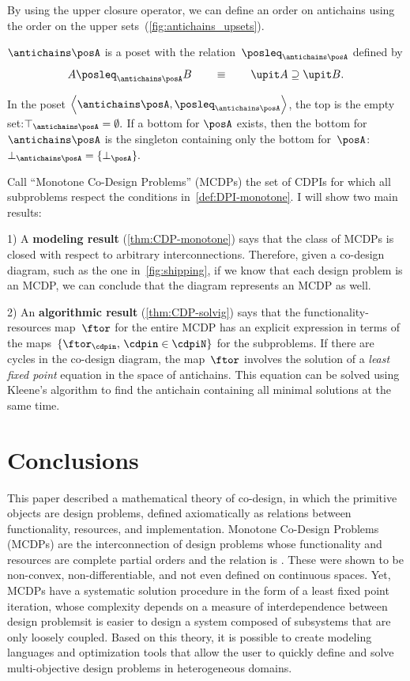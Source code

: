 By using the upper closure operator, we can define an order on antichains
using the order on the upper sets~(\cref{fig:antichains_upsets}).
\begin{lemma}
    \label{lem:antichains-are-poset}$\antichains\posA$ is a poset with
    the relation~$\posleq_{\antichains\posA}$ defined by
    \[
        A\posleq_{\antichains\posA}B\qquad\equiv\qquad\upit A\supseteq\upit B.
    \]
\end{lemma}
In the poset $\left\langle \antichains\posA,\posleq_{\antichains\posA}\right\rangle $,
the top is the empty set:$\top_{\antichains\posA}=\emptyset.$ If
a bottom for $\posA$ exists, then the bottom for~$\antichains\posA$
is the singleton containing only the bottom for~$\posA$: $\bot_{\antichains\posA}=\{\bot_{\posA}\}.$






Call ``Monotone Co-Design Problems'' (MCDPs) the set of CDPIs for
which all subproblems respect the conditions in~\cref{def:DPI-monotone}.
I will show two main results:

1) A \textbf{modeling result} (\cref{thm:CDP-monotone})
says that the class of MCDPs is closed with respect to arbitrary interconnections.
Therefore, given a co-design diagram, such as the one in~\cref{fig:shipping},
if we know that each design problem is an MCDP, we can conclude that
the diagram represents an MCDP as well.

2) An \textbf{algorithmic result }(\cref{thm:CDP-solvig})
says that the functionality-resources map~$\ftor$ for the entire
MCDP has an explicit expression in terms of the maps~$\{\ftor_{\cdpin},\,\cdpin\in\cdpiN\}$
for the subproblems. If there are cycles in the co-design diagram,
the map~$\ftor$ involves the solution of a\emph{ least fixed point}
equation in the space of antichains. This equation can be solved using
Kleene's algorithm to find the antichain containing all minimal solutions
at the same time.


\section{Conclusions}

This paper described a mathematical theory of co-design, in which
the primitive objects are design problems, defined axiomatically as
relations between functionality, resources, and implementation. Monotone
Co-Design Problems (MCDPs) are the interconnection of design problems
whose functionality and resources are complete partial orders and
the relation is \scottcontinuous. These were shown to be non-convex,
non-differentiable, and not even defined on continuous spaces. Yet,
MCDPs have a systematic solution procedure in the form of a least
fixed point iteration, whose complexity depends on a measure of interdependence
between design problems\textemdash it is easier to design a system
composed of subsystems that are only loosely coupled. Based on this
theory, it is possible to create modeling languages and optimization
tools that allow the user to quickly define and solve multi-objective
design problems in heterogeneous domains.






